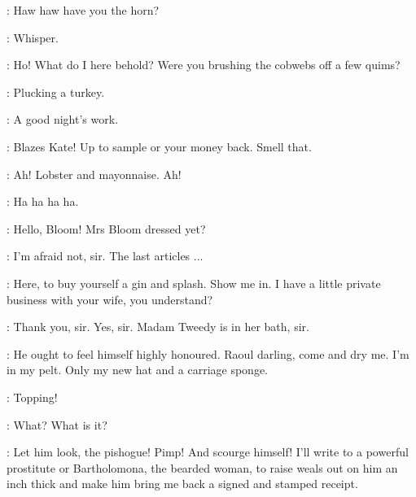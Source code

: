 \Boots:
Haw haw have you the horn?


\Zoe:
Whisper.



\Lenehan:
Ho!
What do I here behold?
Were you brushing the cobwebs off a few quims?

\Boylan:
Plucking a turkey.

\Lenehan:
A good night's work.

\Boylan:
Blazes Kate!
Up to sample or your money back.
Smell that.

\Lenehan:
Ah!
Lobster and mayonnaise.
Ah!

\ZoeAndFlorry:
Ha ha ha ha.

\Boylan:
Hello, Bloom!
Mrs Bloom dressed yet?

\Bloom:
I'm afraid not, sir.
The last articles ...

\Boylan:
Here, to buy yourself a gin and splash.
Show me in.
I have a little private business with your wife, you understand?

\Bloom:
Thank you, sir.
Yes, sir.
Madam Tweedy is in her bath, sir.

\Marion:
He ought to feel himself highly honoured.
Raoul darling, come and dry me.
I'm in my pelt.
Only my new hat and a carriage sponge.

\Boylan:
Topping!

\Bella:
What?
What is it?


\Marion:
Let him look, the pishogue!
Pimp!
And scourge himself!
I'll write to a powerful prostitute or Bartholomona, the bearded woman,
to raise weals out on him an inch thick
and make him bring me back a signed and stamped receipt.

